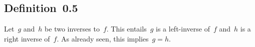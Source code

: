 \subsection{Definition~0.5}

Let~$g$ and~$h$ be two inverses to~$f$.
This entails~$g$ is a left-inverse of~$f$ and~$h$ is a right inverse of~$f$.
As already seen, this implies~$g = h$.
